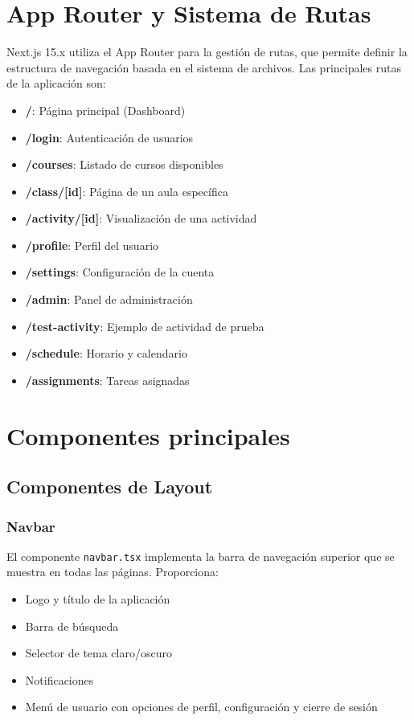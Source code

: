 \documentclass[12pt,a4paper]{report}
\begin{document}
\section{App Router y Sistema de Rutas}
Next.js 15.x utiliza el App Router para la gestión de rutas, que permite definir la estructura de navegación basada en el sistema de archivos. Las principales rutas de la aplicación son:

\begin{itemize}
    \item \textbf{/}: Página principal (Dashboard)
    \item \textbf{/login}: Autenticación de usuarios
    \item \textbf{/courses}: Listado de cursos disponibles
    \item \textbf{/class/[id]}: Página de un aula específica
    \item \textbf{/activity/[id]}: Visualización de una actividad
    \item \textbf{/profile}: Perfil del usuario
    \item \textbf{/settings}: Configuración de la cuenta
    \item \textbf{/admin}: Panel de administración
    \item \textbf{/test-activity}: Ejemplo de actividad de prueba
    \item \textbf{/schedule}: Horario y calendario
    \item \textbf{/assignments}: Tareas asignadas
\end{itemize}

\section{Componentes principales}
\subsection{Componentes de Layout}
\subsubsection{Navbar}
El componente \texttt{navbar.tsx} implementa la barra de navegación superior que se muestra en todas las páginas. Proporciona:

\begin{itemize}
    \item Logo y título de la aplicación
    \item Barra de búsqueda
    \item Selector de tema claro/oscuro
    \item Notificaciones
    \item Menú de usuario con opciones de perfil, configuración y cierre de sesión
\end{itemize}
\end{document}
